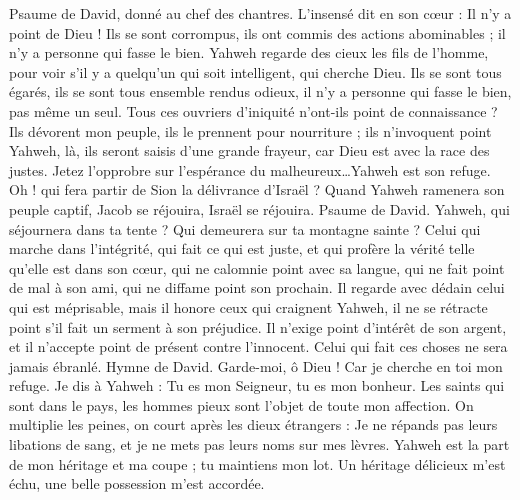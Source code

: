 \begin{multicols}{2}
\VerseOne{}Psaume de David, donné au chef des chantres. L'insensé dit en son cœur : Il n'y a point de Dieu ! Ils se sont corrompus, ils ont commis des actions abominables ; il n'y a personne qui fasse le bien.
Yahweh regarde des cieux les fils de l'homme, pour voir s'il y a quelqu'un qui soit intelligent, qui cherche Dieu.
Ils se sont tous égarés, ils se sont tous ensemble rendus odieux, il n'y a personne qui fasse le bien, pas même un seul.
Tous ces ouvriers d'iniquité n'ont-ils point de connaissance ? Ils dévorent mon peuple, ils le prennent pour nourriture ; ils n'invoquent point Yahweh,
là, ils seront saisis d'une grande frayeur, car Dieu est avec la race des justes.
Jetez l'opprobre sur l'espérance du malheureux…Yahweh est son refuge.
Oh ! qui fera partir de Sion la délivrance d'Israël ? Quand Yahweh ramenera son peuple captif, Jacob se réjouira, Israël se réjouira.
\VerseOne{}Psaume de David. Yahweh, qui séjournera dans ta tente ? Qui demeurera sur ta montagne sainte ?
Celui qui marche dans l'intégrité, qui fait ce qui est juste, et qui profère la vérité telle qu'elle est dans son cœur,
qui ne calomnie point avec sa langue, qui ne fait point de mal à son ami, qui ne diffame point son prochain.
Il regarde avec dédain celui qui est méprisable, mais il honore ceux qui craignent Yahweh, il ne se rétracte point s'il fait un serment à son préjudice.
Il n'exige point d'intérêt de son argent, et il n'accepte point de présent contre l'innocent. Celui qui fait ces choses ne sera jamais ébranlé.
\VerseOne{}Hymne de David. Garde-moi, ô Dieu ! Car je cherche en toi mon refuge.
Je dis à Yahweh : Tu es mon Seigneur, tu es mon bonheur.
Les saints qui sont dans le pays, les hommes pieux sont l'objet de toute mon affection.
On multiplie les peines, on court après les dieux étrangers : Je ne répands pas leurs libations de sang, et je ne mets pas leurs noms sur mes lèvres.
Yahweh est la part de mon héritage et ma coupe ; tu maintiens mon lot.
Un héritage délicieux m'est échu, une belle possession m'est accordée.

\end{multicols}
